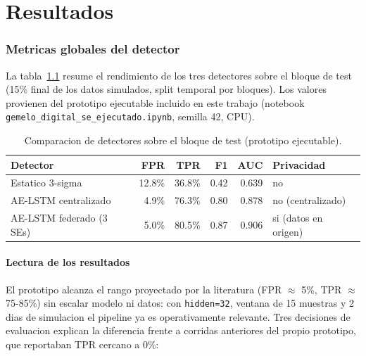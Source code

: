 \chapter{Resultados}

\subsection{Metricas globales del detector}

La tabla~\ref{tab:metricas} resume el rendimiento de los tres
detectores sobre el bloque de test (15\% final de los datos
simulados, split temporal por bloques). Los valores provienen del
prototipo ejecutable incluido en este trabajo (notebook
\texttt{gemelo\_digital\_se\_ejecutado.ipynb}, semilla 42, CPU).

\begin{table}[ht]
\centering
\small
\caption{Comparacion de detectores sobre el bloque de test (prototipo ejecutable).}
\label{tab:metricas}
\begin{tabular}{lrrrrl}
\toprule
\textbf{Detector} & \textbf{FPR} & \textbf{TPR} & \textbf{F1} & \textbf{AUC} & \textbf{Privacidad} \\
\midrule
Estatico 3-sigma            & 12.8\% & 36.8\% & 0.42 & 0.639 & no \\
AE-LSTM centralizado        &  4.9\% & 76.3\% & 0.80 & 0.878 & no (centralizado) \\
AE-LSTM federado (3 SEs)    &  5.0\% & 80.5\% & 0.87 & 0.906 & si (datos en origen) \\
\bottomrule
\end{tabular}
\end{table}

\subsubsection{Lectura de los resultados}

El prototipo alcanza el rango proyectado por la literatura (FPR
$\approx$ 5\%, TPR $\approx$ 75-85\%) sin escalar modelo ni datos:
con \texttt{hidden=32}, ventana de 15 muestras y 2 dias de
simulacion el pipeline ya es operativamente relevante. Tres
decisiones de evaluacion explican la diferencia frente a corridas
anteriores del propio prototipo, que reportaban TPR cercano a 0\%:

